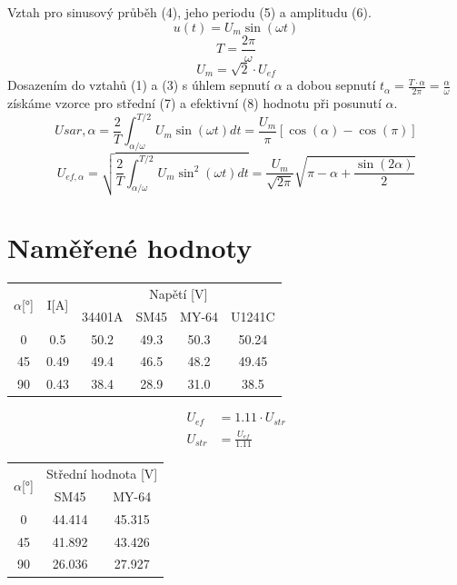 \documentclass{article}
\begin{document}
Vztah pro sinusový průběh (4), jeho periodu (5) a amplitudu (6).
\begin{equation}
	u(t)=U_m\sin(\omega t)
\end{equation}
\begin{equation}
	T=\frac{2 \pi}{\omega}
\end{equation}
\begin{equation}
	U_m=\sqrt{2}\cdot U_{ef}
\end{equation}
Dosazením do vztahů (1) a (3) s úhlem sepnutí $\alpha$ a dobou sepnutí $t_\alpha = \frac{T\cdot\alpha}{2\pi}=\frac{\alpha}{\omega}$ získáme vzorce pro střední (7) a efektivní (8) hodnotu při posunutí $\alpha$.
\begin{equation}
	U{sar,\alpha}=\frac{2}{T}\int_{\alpha/\omega}^{T/2}U_m\sin(\omega t)dt=\frac{U_m}{\pi}[\cos(\alpha)-\cos(\pi)]
\end{equation}
\begin{equation}
	U_{ef,\alpha}=\sqrt{\frac{2}{T}\int_{\alpha/\omega}^{T/2}U_m\sin^2(\omega t)dt} = \frac{U_m}{\sqrt{2\pi}}\sqrt{\pi-\alpha+\frac{\sin(2\alpha)}{2}}
\end{equation}

\section{Naměřené hodnoty}
\begin{tabular}{c|c||c|c|c|c}
	\multirow{2}{*}{$\alpha$[\si{\degree}]} & \multirow{2}{*}{I[\si{\ampere}]} & \multicolumn{4}{c}{Napětí [\si{\volt}] }\\ && 34401A & SM45 & MY-64 & U1241C \\\hline \hline
	0 & 0.5 & 50.2 & 49.3 & 50.3 & 50.24 \\\hline
	45 & 0.49 & 49.4 & 46.5 & 48.2 & 49.45 \\\hline
	90 & 0.43 & 38.4 & 28.9 & 31.0 & 38.5
\end{tabular}

$$
\begin{aligned}
	U_{ef} &= 1.11 \cdot U_{str}\\
	U_{str} &= \frac{U_{ef}}{1.11}
\end{aligned}
$$

\begin{tabular}{c||c|c}
	\multirow{2}{*}{$\alpha$[\si{\degree}]}  & \multicolumn{2}{c}{Střední hodnota [\si{\volt}] }\\ & SM45 & MY-64 \\\hline \hline
	0 & 44.414 & 45.315 \\\hline
	45 & 41.892 & 43.426 \\\hline
	90 & 26.036 & 27.927
\end{tabular}
\end{document}
